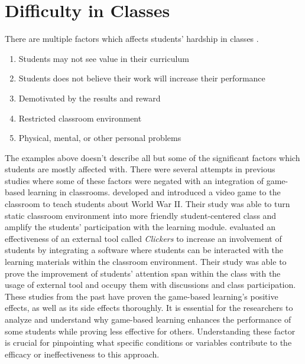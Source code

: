 \section{Difficulty in Classes}
There are multiple factors which affects students' hardship in classes \cite{cmu}.
\begin{enumerate}
    \item Students may not see value in their curriculum
    \item Students does not believe their work will increase their performance
    \item Demotivated by the results and reward
    \item Restricted classroom environment
    \item Physical, mental, or other personal problems
\end{enumerate}
The examples above doesn't describe all but some of the significant factors which students are mostly affected with. There were several attempts in previous studies where some of these factors were negated with an integration of game-based learning in classrooms. \cite{watson2011} developed and introduced a video game to the classroom to teach students about World War II. Their study was able to turn static classroom environment into more friendly student-centered class and amplify the students' participation with the learning module. \cite{clickers2010} evaluated an effectiveness of an external tool called \textit{Clickers} to increase an involvement of students by integrating a software where students can be interacted with the learning materials within the classroom environment. Their study was able to prove the improvement of students' attention span within the class with the usage of external tool and occupy them with discussions and class participation. These studies from the past have proven the game-based learning's positive effects, as well as its side effects thoroughly. It is essential for the researchers to analyze and understand why game-based learning enhances the performance of some students while proving less effective for others. Understanding these factor is crucial for pinpointing what specific conditions or variables contribute to the efficacy or ineffectiveness to this approach.

